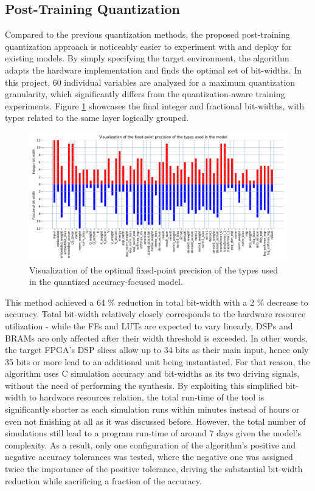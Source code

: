 \subsection{Post-Training Quantization}\label{eval:post-training-quantization}
Compared to the previous quantization methods, the proposed post-training quantization approach is noticeably easier to experiment with and deploy for existing models. By simply specifying the target environment, the algorithm adapts the hardware implementation and finds the optimal set of bit-widths. In this project, 60 individual variables are analyzed for a maximum quantization granularity, which significantly differs from the quantization-aware training experiments. Figure \ref{fig:post-training-bit-widths} showcases the final integer and fractional bit-widths, with types related to the same layer logically grouped.

\begin{figure}[hpt!]
  \centering
  \includegraphics[trim={0cm 0cm 1cm 0cm}, clip, width=1.0\textwidth, center]{../logs/bit_width_visualization.png}
  \caption{Visualization of the optimal fixed-point precision of the types used in the quantized accuracy-focused model.}
  \label{fig:post-training-bit-widths}
\end{figure}

This method achieved a 64 \% reduction in total bit-width with a 2 \% decrease to accuracy. Total bit-width relatively closely corresponds to the hardware resource utilization - while the FFs and LUTs are expected to vary linearly, DSPs and BRAMs are only affected after their width threshold is exceeded. In other words, the target FPGA's DSP slices allow up to 34 bits as their main input, hence only 35 bits or more lead to an additional unit being instantiated. For that reason, the algorithm uses C simulation accuracy and bit-widths as its two driving signals, without the need of performing the synthesis. By exploiting this simplified bit-width to hardware resources relation, the total run-time of the tool is significantly shorter as each simulation runs within minutes instead of hours or even not finishing at all as it was discussed before. However, the total number of simulations still lead to a program run-time of around 7 days given the model's complexity. As a result, only one configuration of the algorithm's positive and negative accuracy tolerances was tested, where the negative one was assigned twice the importance of the positive tolerance, driving the substantial bit-width reduction while sacrificing a fraction of the accuracy.

